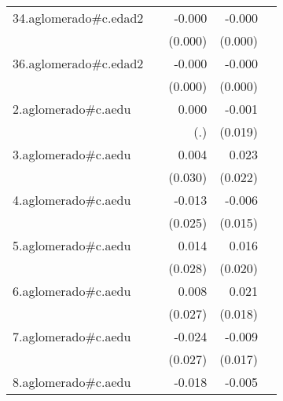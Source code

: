 {\begin{longtable}{l*{4}{D{.}{.}{-1}}}
\addlinespace
34.aglomerado#c.edad2&                     &      -0.000         &      -0.000\sym{***}&                     \\
            &                     &     (0.000)         &     (0.000)         &                     \\
\addlinespace
36.aglomerado#c.edad2&                     &      -0.000         &      -0.000\sym{**} &                     \\
            &                     &     (0.000)         &     (0.000)         &                     \\
\addlinespace
2.aglomerado#c.aedu&                     &       0.000         &      -0.001         &                     \\
            &                     &         (.)         &     (0.019)         &                     \\
\addlinespace
3.aglomerado#c.aedu&                     &       0.004         &       0.023         &                     \\
            &                     &     (0.030)         &     (0.022)         &                     \\
\addlinespace
4.aglomerado#c.aedu&                     &      -0.013         &      -0.006         &                     \\
            &                     &     (0.025)         &     (0.015)         &                     \\
\addlinespace
5.aglomerado#c.aedu&                     &       0.014         &       0.016         &                     \\
            &                     &     (0.028)         &     (0.020)         &                     \\
\addlinespace
6.aglomerado#c.aedu&                     &       0.008         &       0.021         &                     \\
            &                     &     (0.027)         &     (0.018)         &                     \\
\addlinespace
7.aglomerado#c.aedu&                     &      -0.024         &      -0.009         &                     \\
            &                     &     (0.027)         &     (0.017)         &                     \\
\addlinespace
8.aglomerado#c.aedu&                     &      -0.018         &      -0.005         &                     \\

\end{longtable}}
